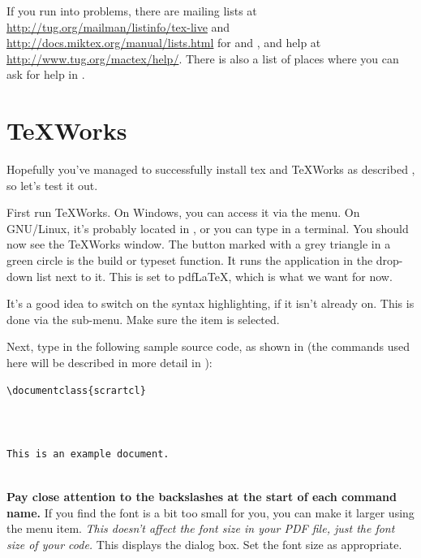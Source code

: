 If you run into problems, there are mailing lists at
\url{http://tug.org/mailman/listinfo/tex-live} and
\url{http://docs.miktex.org/manual/lists.html} for
 and , and
 help at \url{http://www.tug.org/mactex/help/}.
There is also a list of places where you can ask for help in
.


\section{TeXWorks}
\label{sec:texworks}

Hopefully you've managed to successfully install \gls{tex} and TeXWorks as
described , so let's test it out.

First run TeXWorks. On Windows, you can access it via the
 menu. On GNU/Linux, it's probably located in
\menuto{}, or you can type
 in a \gls{terminal}. You should now see the TeXWorks
window. The button marked
with a grey triangle in a green circle is the build or typeset function. It
runs the application in the drop-down list next to it. This is set to
pdfLaTeX, which is what we want for now.

It's a good idea to switch on the syntax highlighting, if it isn't
already on. This is done via the \menuto{} sub-menu. Make sure the  item is selected.

Next, type in the following sample source code, as shown in 
(the commands used here will be described in more detail in
):
\begin{code}
\begin{verbatim}
\documentclass{scrartcl}



This is an example document.


\end{verbatim}
\end{code}
\textbf{Pay close attention to the backslashes at the start of each
command name.} If you find the font is a bit too small for you,
you can make it larger using the \menuto{} menu item.
\emph{This doesn't affect the font size in your PDF file, just the
font size of your code.} This displays the  dialog
box. Set the font size as appropriate.

